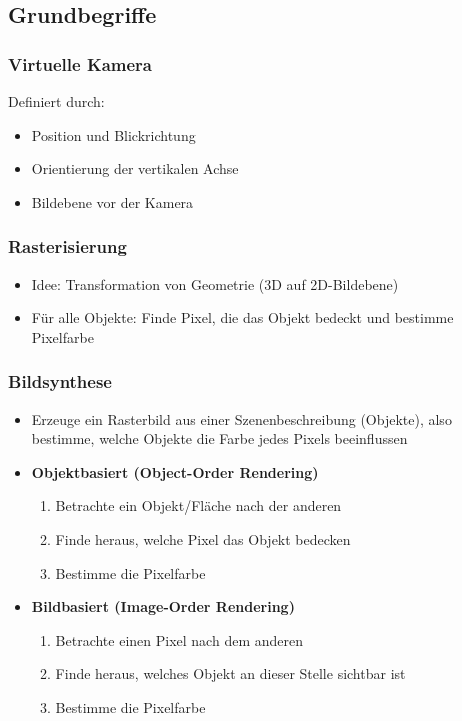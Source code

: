 \subsection{Grundbegriffe}

\subsubsection{Virtuelle Kamera}
Definiert durch:
\begin{itemize}
	\item Position und Blickrichtung
	\item Orientierung der vertikalen Achse
	\item Bildebene vor der Kamera
\end{itemize}

\subsubsection{Rasterisierung}
\begin{itemize}
	\item Idee: Transformation von Geometrie (3D auf 2D-Bildebene)
	\item Für alle Objekte: Finde Pixel, die das Objekt bedeckt und bestimme Pixelfarbe
\end{itemize}

\subsubsection{Bildsynthese}
\begin{itemize}
	\item Erzeuge ein Rasterbild aus einer Szenenbeschreibung (Objekte), also bestimme, welche Objekte die Farbe jedes Pixels beeinflussen
	\item \textbf{Objektbasiert (Object-Order Rendering)}
	\begin{enumerate}
		\item Betrachte ein Objekt/Fläche nach der anderen
		\item Finde heraus, welche Pixel das Objekt bedecken
		\item Bestimme die Pixelfarbe
	\end{enumerate}
	\item \textbf{Bildbasiert (Image-Order Rendering)}
	\begin{enumerate}
		\item Betrachte einen Pixel nach dem anderen
		\item Finde heraus, welches Objekt an dieser Stelle sichtbar ist
		\item Bestimme die Pixelfarbe
	\end{enumerate}
\end{itemize}

